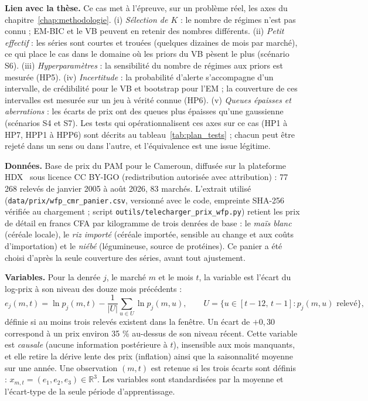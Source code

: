 \textbf{Lien avec la thèse. }Ce cas met à l'épreuve, sur un problème réel, les axes du chapitre~\ref{chap:methodologie}. (i) \emph{Sélection de $K$} : le nombre de régimes n'est pas connu ; EM-BIC et le VB peuvent en retenir des nombres différents. (ii) \emph{Petit effectif} : les séries sont courtes et trouées (quelques dizaines de mois par marché), ce qui place le cas dans le domaine où les priors du VB pèsent le plus (scénario S6). (iii) \emph{Hyperparamètres} : la sensibilité du nombre de régimes aux priors est mesurée (HP5). (iv) \emph{Incertitude} : la probabilité d'alerte s'accompagne d'un intervalle, de crédibilité pour le VB et bootstrap pour l'EM ; la couverture de ces intervalles est mesurée sur un jeu à vérité connue (HP6). (v) \emph{Queues épaisses et aberrations} : les écarts de prix ont des queues plus épaisses qu'une gaussienne (scénarios S4 et S7). Les tests qui opérationnalisent ces axes sur ce cas (HP1 à HP7, HPP1 à HPP6) sont décrits au tableau~\ref{tab:plan_tests} ; chacun peut être rejeté dans un sens ou dans l'autre, et l'équivalence est une issue légitime.

\textbf{Données. }Base de prix du PAM pour le Cameroun, diffusée sur la plateforme HDX~\cite{pam2026donnees} sous licence CC BY-IGO (redistribution autorisée avec attribution) : 77\,268 relevés de janvier 2005 à août 2026, 83 marchés. L'extrait utilisé (\texttt{data/prix/wfp\_cmr\_panier.csv}, versionné avec le code, empreinte SHA-256 vérifiée au chargement ; script \texttt{outils/telecharger\_prix\_wfp.py}) retient les prix de détail en francs CFA par kilogramme de trois denrées de base : le \emph{maïs blanc} (céréale locale), le \emph{riz importé} (céréale importée, sensible au change et aux coûts d'importation) et le \emph{niébé} (légumineuse, source de protéines). Ce panier a été choisi d'après la seule couverture des séries, avant tout ajustement.

\textbf{Variables. }Pour la denrée $j$, le marché $m$ et le mois $t$, la variable est l'écart du log-prix à son niveau des douze mois précédents :
\[
e_j(m,t) = \ln p_j(m,t) - \frac{1}{|U|}\sum_{u \in U} \ln p_j(m,u), \qquad U = \{u \in [t-12,\, t-1] : p_j(m,u) \text{ relevé}\},
\]
définie si au moins trois relevés existent dans la fenêtre. Un écart de $+0{,}30$ correspond à un prix environ 35 \% au-dessus de son niveau récent. Cette variable est \emph{causale} (aucune information postérieure à $t$), insensible aux mois manquants, et elle retire la dérive lente des prix (inflation) ainsi que la saisonnalité moyenne sur une année. Une observation $(m,t)$ est retenue si les trois écarts sont définis : $x_{m,t} = (e_1, e_2, e_3) \in \mathbb{R}^3$. Les variables sont standardisées par la moyenne et l'écart-type de la seule période d'apprentissage.

